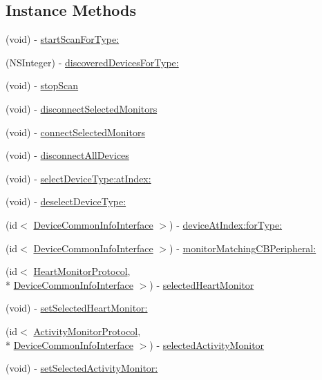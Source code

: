 \subsection*{Instance Methods}
\begin{DoxyCompactItemize}
\item 
(void) -\/ \hyperlink{interface_b_t_device_manager_a8ccfdb80e7396a787703df2e2145783b}{start\-Scan\-For\-Type\-:}
\item 
(N\-S\-Integer) -\/ \hyperlink{interface_b_t_device_manager_af88f5d1516142ed353cdcac2268dadfb}{discovered\-Devices\-For\-Type\-:}
\item 
(void) -\/ \hyperlink{interface_b_t_device_manager_a77d4c5c16c2e82bed7e5f2f65bcd2dfb}{stop\-Scan}
\item 
(void) -\/ \hyperlink{interface_b_t_device_manager_ae310a606d4e735e7813319e366f67aa2}{disconnect\-Selected\-Monitors}
\item 
(void) -\/ \hyperlink{interface_b_t_device_manager_afda16d6654df9d6eddde47c5a3ae38ec}{connect\-Selected\-Monitors}
\item 
(void) -\/ \hyperlink{interface_b_t_device_manager_aee2928325606cb3f338a5ecb8ef35560}{disconnect\-All\-Devices}
\item 
(void) -\/ \hyperlink{interface_b_t_device_manager_af3f435a6fec885eca732034a12239504}{select\-Device\-Type\-:at\-Index\-:}
\item 
(void) -\/ \hyperlink{interface_b_t_device_manager_a916adc15288fd7428a30954a57f0af0a}{deselect\-Device\-Type\-:}
\item 
(id$<$ \hyperlink{protocol_device_common_info_interface-p}{Device\-Common\-Info\-Interface} $>$) -\/ \hyperlink{interface_b_t_device_manager_a84c51142e50c343ffa90c5bf9afee48b}{device\-At\-Index\-:for\-Type\-:}
\item 
(id$<$ \hyperlink{protocol_device_common_info_interface-p}{Device\-Common\-Info\-Interface} $>$) -\/ \hyperlink{interface_b_t_device_manager_af11257d463445c307cd38c9e284c6826}{monitor\-Matching\-C\-B\-Peripheral\-:}
\item 
(id$<$ \hyperlink{protocol_heart_monitor_protocol-p}{Heart\-Monitor\-Protocol}, \\*
\hyperlink{protocol_device_common_info_interface-p}{Device\-Common\-Info\-Interface} $>$) -\/ \hyperlink{interface_b_t_device_manager_a1c4ad74783cb71a008c926f2e5ec3835}{selected\-Heart\-Monitor}
\item 
(void) -\/ \hyperlink{interface_b_t_device_manager_a005786995ec17c9a94e85a882bfd4896}{set\-Selected\-Heart\-Monitor\-:}
\item 
(id$<$ \hyperlink{protocol_activity_monitor_protocol-p}{Activity\-Monitor\-Protocol}, \\*
\hyperlink{protocol_device_common_info_interface-p}{Device\-Common\-Info\-Interface} $>$) -\/ \hyperlink{interface_b_t_device_manager_aaca0fdc9335bbc7465e91ad0f5c4dbb2}{selected\-Activity\-Monitor}
\item 
(void) -\/ \hyperlink{interface_b_t_device_manager_a6d8e2982b9a3ad004563736f89d98cb1}{set\-Selected\-Activity\-Monitor\-:}
\end{DoxyCompactItemize}
